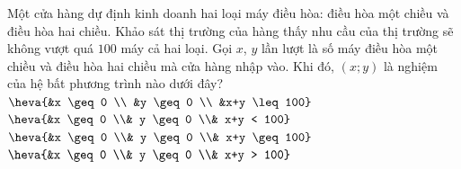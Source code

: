 \begin{ex}%
	Một cửa hàng dự định kinh doanh hai loại máy điều hòa: điều hòa một chiều và điều hòa hai chiều. Khảo sát thị trường của hàng thấy nhu cầu của thị trường sẽ không vượt quá $100$ máy cả hai loại. Gọi $x$, $y$ lần lượt là số máy điều hòa một chiều và điều hòa hai chiều mà cửa hàng nhập vào. Khi đó, $(x; y)$ là nghiệm của hệ bất phương trình nào dưới đây?
	\choice
	{\True $\heva{&x \geq 0 \\ &y \geq 0 \\ &x+y \leq 100}$}
	{$\heva{&x \geq 0 \\& y \geq 0 \\& x+y < 100}$}
	{$\heva{&x \geq 0 \\& y \geq 0 \\& x+y \geq 100}$}
	{$\heva{&x \geq 0 \\& y \geq 0 \\& x+y > 100}$}
\end{ex}
